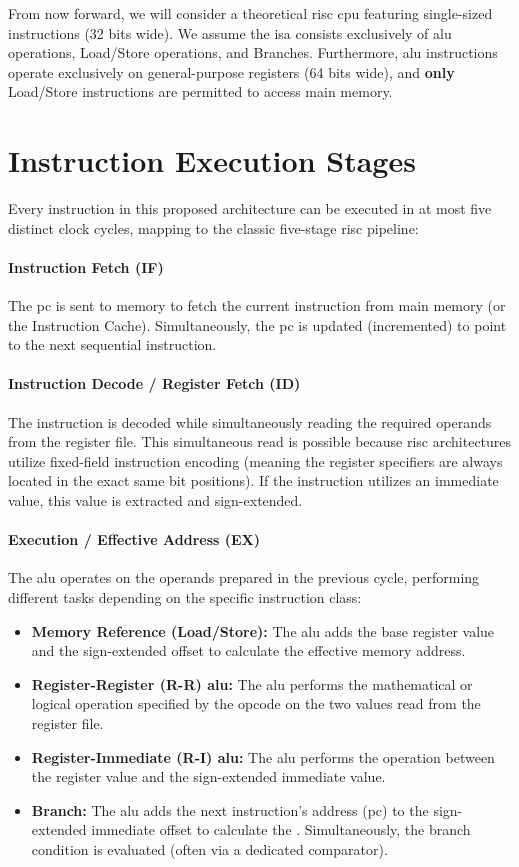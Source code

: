 \noindent From now forward, we will consider a theoretical \gls{risc} \gls{cpu} featuring single-sized instructions (32 bits wide). We assume the \gls{isa} consists exclusively of \gls{alu} operations, Load/Store operations, and Branches. Furthermore, \gls{alu} instructions operate exclusively on general-purpose registers (64 bits wide), and \textbf{only} Load/Store instructions are permitted to access main memory.

\section{Instruction Execution Stages}
Every instruction in this proposed architecture can be executed in at most five distinct clock cycles, mapping to the classic five-stage \gls{risc} pipeline:

\paragraph{Instruction Fetch (IF)} 
The \gls{pc} is sent to memory to fetch the current instruction from main memory (or the Instruction Cache). Simultaneously, the \gls{pc} is updated (incremented) to point to the next sequential instruction.

\paragraph{Instruction Decode / Register Fetch (ID)} 
The instruction is decoded while simultaneously reading the required operands from the register file. This simultaneous read is possible because \gls{risc} architectures utilize fixed-field instruction encoding (meaning the register specifiers are always located in the exact same bit positions). If the instruction utilizes an immediate value, this value is extracted and sign-extended.

\paragraph{Execution / Effective Address (EX)} 
The \gls{alu} operates on the operands prepared in the previous cycle, performing different tasks depending on the specific instruction class:
\begin{itemize}
    \item \textbf{Memory Reference (Load/Store):} The \gls{alu} adds the base register value and the sign-extended offset to calculate the effective memory address.
    \item \textbf{Register-Register (R-R) \gls{alu}:} The \gls{alu} performs the mathematical or logical operation specified by the opcode on the two values read from the register file.
    \item \textbf{Register-Immediate (R-I) \gls{alu}:} The \gls{alu} performs the operation between the register value and the sign-extended immediate value.
    \item \textbf{Branch:} The \gls{alu} adds the next instruction's address (\gls{pc}) to the sign-extended immediate offset to calculate the . Simultaneously, the branch condition is evaluated (often via a dedicated comparator).
\end{itemize}

